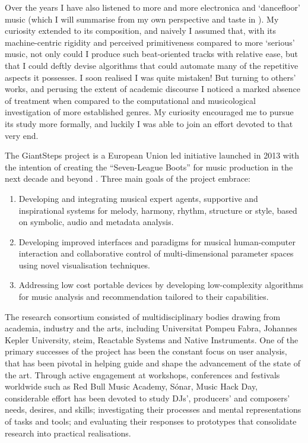 Over the years I have also listened to more and more electronica and `dancefloor' music (which I will summarise from my own perspective and taste in ). My curiosity extended to its composition, and naively I assumed that, with its machine-centric rigidity and perceived primitiveness compared to more `serious' music, not only could I produce such beat-oriented tracks with relative ease, but that I could deftly devise algorithms that could automate many of the repetitive aspects it possesses. I soon realised I was quite mistaken! But turning to others' works, and perusing the extent of academic discourse I noticed a marked absence of treatment when compared to the computational and musicological investigation of more established genres. My curiosity encouraged me to pursue its study more formally, and luckily I was able to join an effort devoted to that very end.

The GiantSteps project is a European Union led initiative launched in 2013 with the intention of creating the ``Seven-League Boots'' for music production in the next decade and beyond \citep{Knees2016a}. Three main goals of the project embrace:

\begin{enumerate}
  \item Developing and integrating musical expert agents, supportive and inspirational systems for melody, harmony, rhythm, structure or style, based on symbolic, audio and metadata analysis.
  \item Developing improved interfaces and paradigms for musical human-computer interaction and collaborative control of multi-dimensional parameter spaces using novel visualisation techniques.
  \item Addressing low cost portable devices by developing low-complexity algorithms for music analysis and recommendation tailored to their capabilities.
\end{enumerate}

The research consortium consisted of multidisciplinary bodies drawing from academia, industry and the arts, including Universitat Pompeu Fabra, Johannes Kepler University, \acrshort{steim}, Reactable Systems and Native Instruments. One of the primary successes of the project has been the constant focus on user analysis, that has been pivotal in helping guide and shape the advancement of the state of the art. Through active engagement at workshops, conferences and festivals worldwide such as Red Bull Music Academy, Sónar, Music Hack Day, considerable effort has been devoted to study DJs', producers' and composers' needs, desires, and skills; investigating their processes and mental representations of tasks and tools; and evaluating their responses to prototypes that consolidate research into practical realisations.

